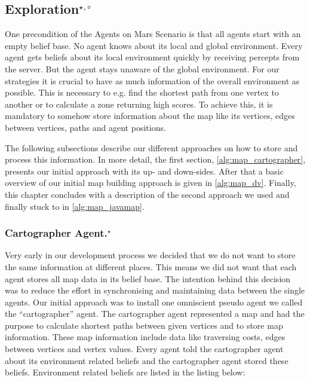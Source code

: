 \subsection[Exploration]{Exploration$^{\star,\circ}$}\label{alg:exploration} %
One precondition of the Agents on Mars Scenario is that all agents start with an empty belief base.
No agent knows about its local and global environment.
Every agent gets beliefs about its local environment quickly by receiving percepts from the server. %
But the agent stays unaware of the global environment.
For our strategies it is crucial to have as much information of the overall environment as possible.
This is necessary to e.g. find the shortest path from one vertex to another or to calculate a zone returning high scores.
To achieve this, it is mandatory to somehow store information about the map like its vertices, edges between vertices, paths and agent positions.

The following subsections describe our different approaches on how to store and process this information.
In more detail, the first section, \autoref{alg:map_cartographer}, presents our initial approach with its up- and down-sides.
After that a basic overview of our initial map building approach is given in \autoref{alg:map_dv}.
Finally, this chapter concludes with a description of the second approach we used and finally stuck to in \autoref{alg:map_javamap}. %

\subsubsection[Cartographer Agent]{Cartographer Agent.$^\star$}\label{alg:map_cartographer}
Very early in our development process we decided that we do not want to store the same information at different places.
This means we did not want that each agent stores all map data in its belief base.
The intention behind this decision was to reduce the effort in synchronising and maintaining data between the single agents.
Our initial approach was to install one omniscient pseudo agent we called the ``cartographer'' agent.
The cartographer agent represented a map and had the purpose to calculate shortest paths between given vertices and to store map information.
These map information include data like traversing costs, edges between vertices and vertex values.
Every agent told the cartographer agent about its environment related beliefs and the cartographer agent stored these beliefs.
Environment related beliefs are listed in the listing below:

